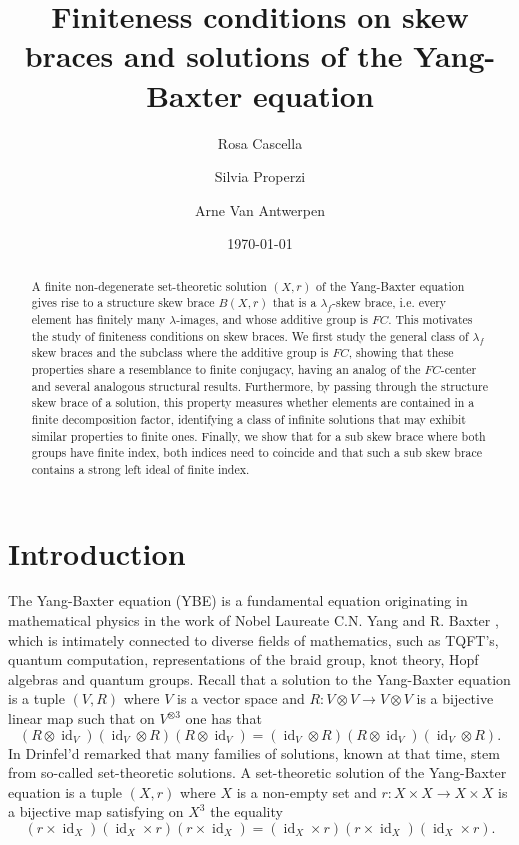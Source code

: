 \documentclass{amsart}
\title[Finiteness conditions on skew braces and solutions of YBE]{Finiteness conditions on skew braces and solutions of the Yang-Baxter equation}
\author[Rosa Cascella]{Rosa Cascella\orcidlink{0009-0006-6386-7252}}
\author[Silvia Properzi]{Silvia Properzi\orcidlink{0000-0002-8228-9156}}
\author[Arne Van Antwerpen]{Arne Van Antwerpen\orcidlink{0000-0001-7619-6298}}
\date{\today}
\newcommand{\id}{\operatorname{id}}
\begin{document}
\begin{abstract}
  A finite non-degenerate set-theoretic solution $(X,r)$ of the Yang-Baxter equation gives rise to a structure skew brace $B(X,r)$
  that is a $\lambda_f$-skew brace, i.e.
  every element has finitely many $\lambda$-images, and whose additive group is $FC$.
  This motivates the study of finiteness conditions on skew braces.
  We first study the general class of $\lambda_f$ skew braces and the subclass where the additive group is $FC$, showing that these properties share a resemblance to finite conjugacy, having an analog of the $FC$-center and several analogous structural results.
 Furthermore, by passing through the structure skew brace of a solution,
 this property measures whether elements are contained in a finite decomposition factor,
 identifying a class of infinite solutions that may exhibit similar properties to finite ones.
 Finally, we show that for a sub skew brace where both groups have finite index,
 both indices need to coincide and that such a sub skew brace contains a strong left ideal of finite index.
\end{abstract}

\maketitle

\section{Introduction}

The Yang-Baxter equation (YBE) is a fundamental equation originating in mathematical physics in the work of Nobel Laureate C.N. Yang \cite{MR261870} and R. Baxter \cite{MR690578}, which is intimately connected to diverse fields of mathematics, such as TQFT's, quantum computation, representations of the braid group, knot theory, Hopf algebras and quantum groups. Recall that a solution to the Yang-Baxter equation is a tuple $(V,R)$ where $V$ is a vector space and $R\colon V \otimes V \rightarrow V \otimes V$ is a bijective linear map such that on $V^{\otimes 3}$ one has that $$(R \otimes \id_V) (\id_V\otimes R)(R \otimes \id_V) = (\id_V\otimes R)(R \otimes \id_V) (\id_V\otimes R).$$ 
In \cite{MR1183474} Drinfel'd remarked that many families of solutions, known at that time, stem from so-called set-theoretic solutions. A set-theoretic solution of the Yang-Baxter equation is a tuple $(X,r)$ where $X$ is a non-empty set and $r:X \times X \rightarrow X \times X$ is a bijective map satisfying on $X^3$ the equality $$ (r \times \id_X)(\id_X \times r)(r \times \id_X) = (\id_X \times r)(r \times \id_X)(\id_X \times r).$$ 
\end{document}
